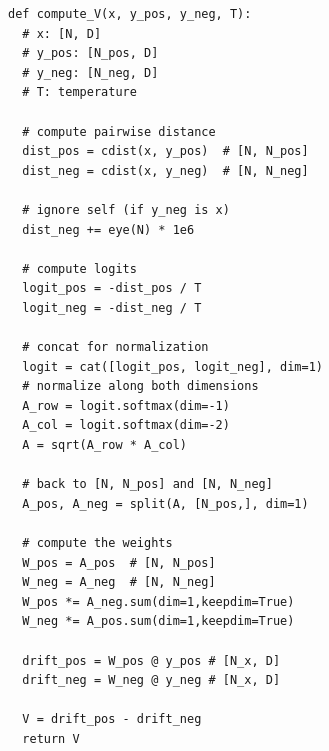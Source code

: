 \begin{algorithm}[t]
\caption{Computing the drifting field $\V$.}
\label{alg:drift_code}
\begin{lstlisting}
def compute_V(x, y_pos, y_neg, T):
  # x: [N, D]
  # y_pos: [N_pos, D]
  # y_neg: [N_neg, D]
  # T: temperature

  # compute pairwise distance
  dist_pos = cdist(x, y_pos)  # [N, N_pos]
  dist_neg = cdist(x, y_neg)  # [N, N_neg]
  
  # ignore self (if y_neg is x)
  dist_neg += eye(N) * 1e6

  # compute logits
  logit_pos = -dist_pos / T
  logit_neg = -dist_neg / T

  # concat for normalization
  logit = cat([logit_pos, logit_neg], dim=1)
  # normalize along both dimensions
  A_row = logit.softmax(dim=-1)
  A_col = logit.softmax(dim=-2)
  A = sqrt(A_row * A_col) 

  # back to [N, N_pos] and [N, N_neg]
  A_pos, A_neg = split(A, [N_pos,], dim=1)

  # compute the weights
  W_pos = A_pos  # [N, N_pos]
  W_neg = A_neg  # [N, N_neg]
  W_pos *= A_neg.sum(dim=1,keepdim=True)
  W_neg *= A_pos.sum(dim=1,keepdim=True)

  drift_pos = W_pos @ y_pos # [N_x, D]
  drift_neg = W_neg @ y_neg # [N_x, D]

  V = drift_pos - drift_neg
  return V 
\end{lstlisting}
\end{algorithm}